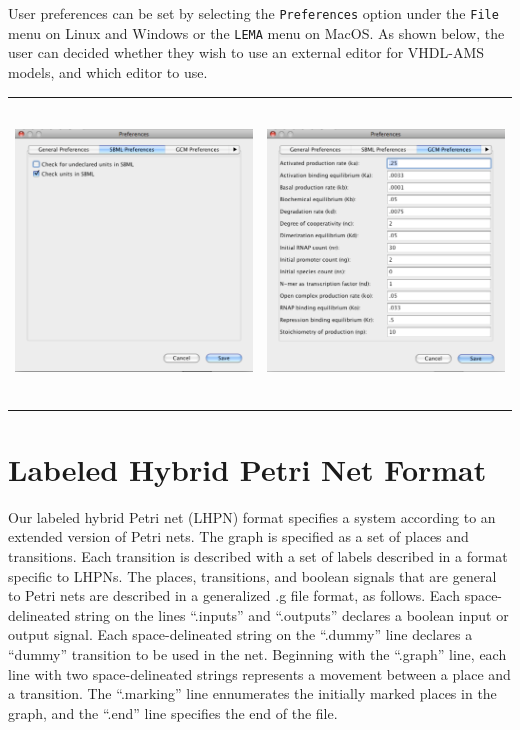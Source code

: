 \documentclass[titlepage,11pt]{article}
\begin{document}
\noindent
User preferences can be set by selecting the {\tt Preferences} option
under the {\tt File} menu on Linux and Windows or the {\tt LEMA} 
menu on MacOS.  As shown below, the user can decided whether they wish
to use an external editor for VHDL-AMS models, and which editor to use.
\begin{center}
\begin{tabular}{cc}
\includegraphics[height=80mm]{screenshots/SBMLPref} &
\includegraphics[height=80mm]{screenshots/GCMPref}
\end{tabular}
\end{center}

\section{\label{LHPN}Labeled Hybrid Petri Net Format}

\noindent
Our labeled hybrid Petri net (LHPN) format specifies a system according to an
extended version of Petri nets.  The graph is specified as a set of places and
transitions.  Each transition is described with a set of labels described in a
format specific to LHPNs.  The places, transitions, and boolean signals that are
general to Petri nets are described in a generalized .g file format, as follows.
Each space-delineated string on the lines ``.inputs'' and ``.outputs''
declares a boolean input or output signal.  Each space-delineated string on the
``.dummy'' line declares a ``dummy'' transition to be used in the net.
Beginning with the ``.graph'' line, each line with two space-delineated strings
represents a movement between a place and a transition.  The ``.marking'' line
ennumerates the initially marked places in the graph, and the ``.end'' line
specifies the end of the file.
\end{document}
